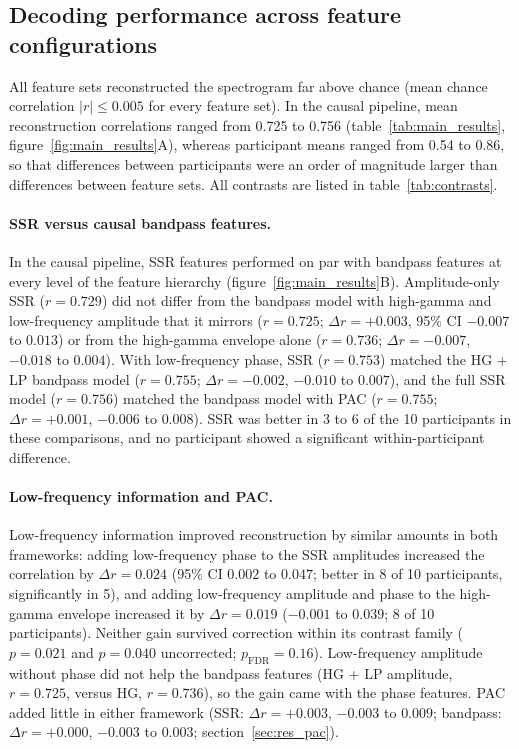 \documentclass{iopjournal}
\begin{document}
\subsection{Decoding performance across feature configurations}
\label{sec:res_decoding}

All feature sets reconstructed the spectrogram far above chance (mean chance correlation $|r|\le0.005$ for every feature set). In the causal pipeline, mean reconstruction correlations ranged from 0.725 to 0.756 (table~\ref{tab:main_results}, figure~\ref{fig:main_results}A), whereas participant means ranged from 0.54 to 0.86, so that differences between participants were an order of magnitude larger than differences between feature sets. All contrasts are listed in table~\ref{tab:contrasts}.

\paragraph{SSR versus causal bandpass features.} In the causal pipeline, SSR features performed on par with bandpass features at every level of the feature hierarchy (figure~\ref{fig:main_results}B). Amplitude-only SSR ($r=0.729$) did not differ from the bandpass model with high-gamma and low-frequency amplitude that it mirrors ($r=0.725$; $\Delta r=+0.003$, 95\% CI $-0.007$ to $0.013$) or from the high-gamma envelope alone ($r=0.736$; $\Delta r=-0.007$, $-0.018$ to $0.004$). With low-frequency phase, SSR ($r=0.753$) matched the HG + LP bandpass model ($r=0.755$; $\Delta r=-0.002$, $-0.010$ to $0.007$), and the full SSR model ($r=0.756$) matched the bandpass model with PAC ($r=0.755$; $\Delta r=+0.001$, $-0.006$ to $0.008$). SSR was better in 3 to 6 of the 10 participants in these comparisons, and no participant showed a significant within-participant difference.

\paragraph{Low-frequency information and PAC.} Low-frequency information improved reconstruction by similar amounts in both frameworks: adding low-frequency phase to the SSR amplitudes increased the correlation by $\Delta r=0.024$ (95\% CI $0.002$ to $0.047$; better in 8 of 10 participants, significantly in 5), and adding low-frequency amplitude and phase to the high-gamma envelope increased it by $\Delta r=0.019$ ($-0.001$ to $0.039$; 8 of 10 participants). Neither gain survived correction within its contrast family ($p=0.021$ and $p=0.040$ uncorrected; $p_{\mathrm{FDR}}=0.16$). Low-frequency amplitude without phase did not help the bandpass features (HG + LP amplitude, $r=0.725$, versus HG, $r=0.736$), so the gain came with the phase features. PAC added little in either framework (SSR: $\Delta r=+0.003$, $-0.003$ to $0.009$; bandpass: $\Delta r=+0.000$, $-0.003$ to $0.003$; section~\ref{sec:res_pac}).
\end{document}
